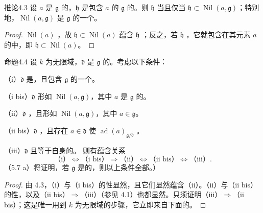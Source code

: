 \begin{SGAresult}{推论}{4.3}
设 $a$ 是 $\mathfrak g$ 的，$\mathfrak h$ 是包含 $a$ 的 $\mathfrak g$ 的。则 $\mathfrak h$ 当且仅当 $\mathfrak h\subset\operatorname{Nil}(a,\mathfrak g)$；特别地，$\operatorname{Nil}(a,\mathfrak g)$ 是 $\mathfrak g$ 的一个。
\end{SGAresult}
\begin{proof}
$\operatorname{Nil}(a)$ ，故 $\mathfrak h\subset\operatorname{Nil}(a)$ 蕴含 $\mathfrak h$ ；反之，若 $\mathfrak h$ ，它就包含在其元素 $a$ 的中，即 $\mathfrak h\subset\operatorname{Nil}(a)$。
\end{proof}
\begin{SGAresult}{命题}{4.4}
设 $k$ 为无限域，$\mathfrak d$ 是 $\mathfrak g$ 的。考虑以下条件：

（i）$\mathfrak d$ 是，且包含 $\mathfrak g$ 的一个。

（i bis）$\mathfrak d$ 形如 $\operatorname{Nil}(a,\mathfrak g)$，其中 $a$ 是 $\mathfrak g$ 的。

（ii）$\mathfrak d$ ，且形如 $\operatorname{Nil}(a,\mathfrak g)$，其中 $a\in\mathfrak g$。

（ii bis）$\mathfrak d$ ，且存在 $a\in\mathfrak d$ 使 $\operatorname{ad}(a)_{\mathfrak g/\mathfrak d}$ 。

（iii）$\mathfrak d$ 且等于自身的。
则有蕴含关系
\[\text{（i）}\Leftrightarrow\text{（i bis）}\Rightarrow\text{（ii）}\Leftrightarrow\text{（ii bis）}\Leftrightarrow\text{（iii）}.\]
（5.7 a）将证明，若 $\mathfrak g$ 是的，则以上条件全部。）
\end{SGAresult}
\begin{proof}
由 4.3，（i）与（i bis）的性显然，且它们显然蕴含（ii）。（ii）与（ii bis）的性，以及（ii bis）$\Rightarrow$（iii）（参见 4.1）也都显然。只须证明（iii）$\Rightarrow$（ii bis）；这是唯一用到 $k$ 为无限域的步骤，它立即来自下面的。
\end{proof}
